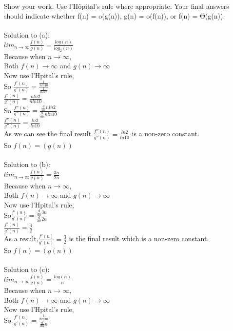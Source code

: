 \documentclass[12pt]{article}
\begin{document}
\begin{enumerate}
Show your work. Use l'Hôpital's rule where appropriate. Your final answers should indicate whether f(n) = o(g(n)), g(n) = o(f(n)), or f(n) = Θ(g(n)). 
\\\\Solution to (a):
\\$lim_{n\rightarrow\infty} \frac{f(n)}{g(n)} = \frac{log(n)}{log_2(n)}$
\\Because when $n\rightarrow \infty$,
\\Both $f(n) \rightarrow \infty$ and $g(n)\rightarrow \infty$
\\Now use l'Hpital's rule,
\\So $\frac{f'(n)}{g'(n)} = \frac{\frac{1}{nln10}}{ \frac{1}{nln2}}$
\\ $\frac{f'(n)}{g'(n)} = \frac{nln2}{nln10}$
\\So $\frac{f''(n)}{g''(n)} = \frac{\frac{d}{dn}nln2}{\frac{d}{dn}nln10} $
\\ $\frac{f''(n)}{g''(n)} =  \frac{ln2}{ln10}$
\\As we can see the final result $\frac{f''(n)}{g''(n)}= \frac{ln2}{ln10}$ is a non-zero constant.
\\So $f(n) = (g(n))$
\\\\Solution to (b):
\\$lim_{n\rightarrow\infty} \frac{f(n)}{g(n)} = \frac{3n}{2n}$
\\Because when $n\rightarrow \infty$,
\\Both $f(n)\rightarrow \infty$ and $g(n)\rightarrow \infty$
\\Now use l'Hpital's rule,
\\So$\frac{f'(n)}{g'(n)} = \frac{\frac{d}{dn}3n}{\frac{d}{dn}2n} $
\\$\frac{f'(n)}{g'(n)}=\frac{3}{2}$
\\As a result,$ \frac{f'(n)}{g'(n)} = \frac{3}{2}$ is the final result which is a non-zero constant.
\\So $f(n) = (g(n))$
\\\\Solution to (c):
\\$lim_{n\rightarrow\infty} \frac{f(n)}{g(n)} = \frac{log(n)}{n}$
\\Because when $n\rightarrow \infty$,
\\Both $f(n) \rightarrow \infty$ and $g(n)\rightarrow \infty$
\\Now use l'Hpital's rule,
\\So $\frac{f'(n)}{g'(n)} = \frac{\frac{1}{nln10}}{ \frac{d}{dn}n}$

\end{enumerate}
\end{document}
